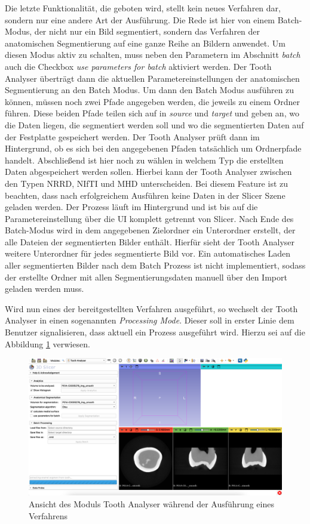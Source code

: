 Die letzte Funktionalität, die geboten wird, stellt kein neues Verfahren dar, sondern
nur eine andere Art der Ausführung. Die Rede ist hier von einem Batch-Modus, der
nicht nur ein Bild segmentiert, sondern das Verfahren der anatomischen
Segmentierung auf eine ganze Reihe an Bildern anwendet. Um diesen Modus aktiv zu
schalten, muss neben den Parametern im Abschnitt \textit{batch} auch die Checkbox
\textit{use parameters for batch} aktiviert werden. Der Tooth Analyser überträgt
dann die aktuellen Parametereinstellungen der anatomischen Segmentierung an den Batch
Modus. Um dann den Batch Modus ausführen zu können, müssen noch zwei Pfade angegeben
werden, die jeweils zu einem Ordner führen. Diese beiden Pfade teilen sich auf in
\textit{source} und \textit{target} und geben an, wo die Daten liegen, die segmentiert
werden soll und wo die segmentierten Daten auf der Festplatte gespeichert werden.
Der Tooth Analyser prüft dann im Hintergrund, ob es sich bei den angegebenen Pfaden
tatsächlich um Ordnerpfade handelt. Abschließend ist hier noch zu wählen in
welchem Typ die erstellten Daten abgespeichert werden sollen. Hierbei kann der Tooth
Analyser zwischen den Typen \ac{NRRD}, \ac{NIfTI} und \ac{MHD} unterscheiden.
Bei diesem Feature ist zu beachten, dass nach erfolgreichem Ausführen keine Daten
in der Slicer Szene geladen werden. Der Prozess läuft im Hintergrund und ist bis
auf die Parametereinstellung über die \ac{UI} komplett getrennt von Slicer. Nach
Ende des Batch-Modus wird in dem angegebenen Zielordner ein Unterordner erstellt,
der alle Dateien der segmentierten Bilder enthält. Hierfür sieht der Tooth
Analyser weitere Unterordner für jedes segmentierte Bild vor. Ein automatisches Laden
aller segmentierten Bilder nach dem Batch Prozess ist nicht implementiert,
sodass der erstellte Ordner mit allen Segmentierungsdaten manuell über den
Import geladen werden muss.

Wird nun eines der bereitgestellten Verfahren ausgeführt, so wechselt der Tooth Analyser
in einen sogenannten \textit{Processing Mode}. Dieser soll in erster Linie dem Benutzer
signalisieren, dass aktuell ein Prozess ausgeführt wird. Hierzu sei auf die Abbildung
\ref{fig:processing_mode} verwiesen.

\begin{figure}[h]
	\centering
	\includegraphics[scale=1, width=\textwidth]{img/processingMode.png}
	\caption{Ansicht des Moduls Tooth Analyser während der Ausführung eines
	Verfahrens}
	\label{fig:processing_mode}
\end{figure}

